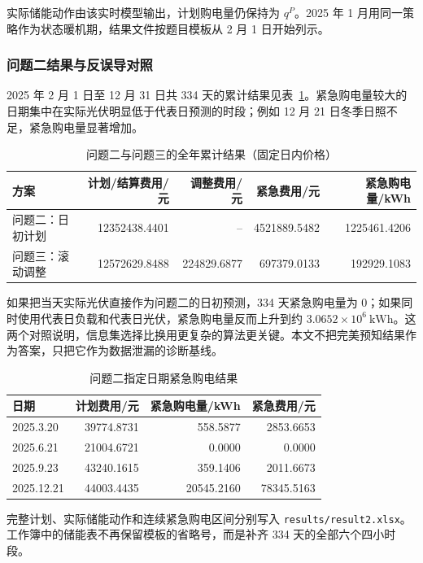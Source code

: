 \documentclass[withoutpreface]{cumcmthesis}
\begin{document}
实际储能动作由该实时模型输出，计划购电量仍保持为 $q^P$。2025 年 1 月用同一策略作为状态暖机期，结果文件按题目模板从 2 月 1 日开始列示。

\subsubsection{问题二结果与反误导对照}
2025 年 2 月 1 日至 12 月 31 日共 334 天的累计结果见表~\ref{tab:q2total}。紧急购电量较大的日期集中在实际光伏明显低于代表日预测的时段；例如 12 月 21 日冬季日照不足，紧急购电量显著增加。

\begin{table}[H]
\centering
\caption{问题二与问题三的全年累计结果（固定日内价格）}\label{tab:q2total}
\begin{tabular}{lrrrr}
\toprule
方案 & 计划/结算费用/元 & 调整费用/元 & 紧急费用/元 & 紧急购电量/kWh\\
\midrule
问题二：日初计划 & 12352438.4401 & -- & 4521889.5482 & 1225461.4206\\
问题三：滚动调整 & 12572629.8488 & 224829.6877 & 697379.0133 & 192929.1083\\
\bottomrule
\end{tabular}
\end{table}

如果把当天实际光伏直接作为问题二的日初预测，334 天紧急购电量为 0；如果同时使用代表日负载和代表日光伏，紧急购电量反而上升到约 $3.0652\times10^6\ \mathrm{kWh}$。这两个对照说明，信息集选择比换用更复杂的算法更关键。本文不把完美预知结果作为答案，只把它作为数据泄漏的诊断基线。

\begin{table}[H]
\centering
\caption{问题二指定日期紧急购电结果}\label{tab:q2target}
\begin{tabular}{lrrr}
\toprule
日期 & 计划费用/元 & 紧急购电量/kWh & 紧急费用/元\\
\midrule
2025.3.20 & 39774.8731 & 558.5877 & 2853.6653\\
2025.6.21 & 21004.6721 & 0.0000 & 0.0000\\
2025.9.23 & 43240.1615 & 359.1406 & 2011.6673\\
2025.12.21 & 44003.4435 & 20545.2160 & 78345.5163\\
\bottomrule
\end{tabular}
\end{table}

完整计划、实际储能动作和连续紧急购电区间分别写入 \texttt{results/result2.xlsx}。工作簿中的储能表不再保留模板的省略号，而是补齐 334 天的全部六个四小时段。
\end{document}
